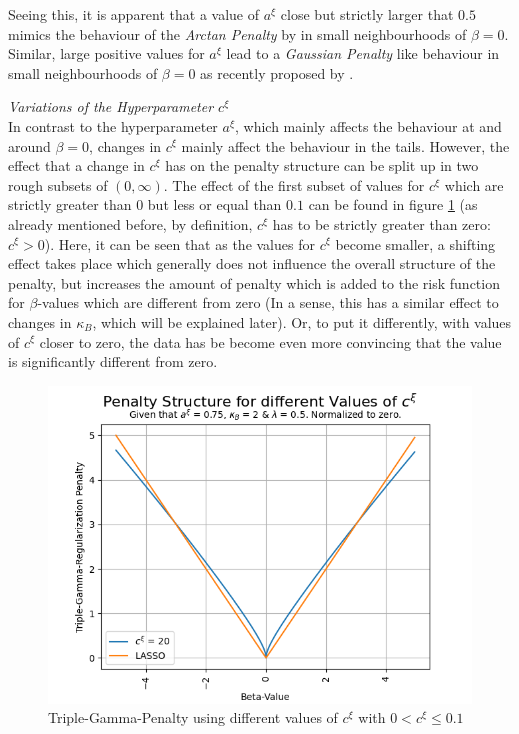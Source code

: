 \documentclass[12pt,a4paper]{article}
\begin{document}
Seeing this, it is apparent that a value of $a^\xi$ close but strictly larger that $0.5$ mimics the behaviour of the \textit{Arctan Penalty} by \textcite{WangZhu2016} in small neighbourhoods of $\beta=0$. Similar, large positive values for $a^\xi$ lead to a \textit{Gaussian Penalty} like behaviour in small neighbourhoods of $\beta = 0$ as recently proposed by \textcite{JohnVettamWu2022}.\\
\newpage

\textit{Variations of the Hyperparameter $c^\xi$}\\

In contrast to the hyperparameter $a^\xi$, which mainly affects the behaviour at and around $\beta=0$, changes in $c^\xi$ mainly affect the behaviour in the tails. However, the effect that a change in $c^\xi$ has on the penalty structure can be split up in two rough subsets of $(0,\infty)$. The effect of the first subset of values for $c^\xi$ which are strictly greater than $0$ but less or equal than $0.1$ can be found in figure \ref{fig:ChangeInC_SmallValues} (as already mentioned before, by definition, $c^\xi$ has to be strictly greater than zero: $c^\xi > 0$). Here, it can be seen that as the values for $c^\xi$ become smaller, a shifting effect takes place which generally does not influence the overall structure of the penalty, but increases the amount of penalty which is added to the risk function for $\beta$-values which are different from zero (In a sense, this has a similar effect to changes in $\kappa_B$, which will be explained later). Or, to put it differently, with values of $c^\xi$ closer to zero, the data has be become even more convincing that the value is significantly different from zero.\\


\begin{figure}[!h]
\centering
\includegraphics[scale=0.75]{../02_simulation/021_simulation_figures/TGPenalty_ChangeInC_Part2.png}
\caption{Triple-Gamma-Penalty using different values of $c^\xi$ with $0 < c^\xi \leq 0.1$}
\label{fig:ChangeInC_SmallValues}
\end{figure}
\end{document}
